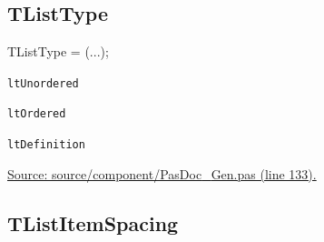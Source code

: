 \documentclass{report}
\newif\ifpdf
\begin{document}
\subsection*{TListType}
\fi
\label{PasDoc_Gen-TListType}
\begin{list}{}{
\setlength{\itemindent}{0cm}
\setlength{\listparindent}{0cm}
\setlength{\leftmargin}{\evensidemargin}
\addtolength{\leftmargin}{\tmplength}
\settowidth{\labelsep}{X}
\addtolength{\leftmargin}{\labelsep}
\setlength{\labelwidth}{\tmplength}
}
\item[\textbf{Declaration}\hfill]
\ifpdf
\begin{flushleft}
\fi
\begin{ttfamily}
TListType = (...);\end{ttfamily}

\ifpdf
\end{flushleft}
\fi

\par
\item[\textbf{Description}]
 \item[\textbf{Values}]
\begin{description}
\item[\texttt{ltUnordered}] \label{PasDoc_Gen-ltUnordered}
\index{}
 
\item[\texttt{ltOrdered}] \label{PasDoc_Gen-ltOrdered}
\index{}
 
\item[\texttt{ltDefinition}] \label{PasDoc_Gen-ltDefinition}
\index{}
 
\end{description}
\par
\href{https://github.com/pasdoc/pasdoc/blob/master/source/component/PasDoc_Gen.pas#L133}{Source: source/component/PasDoc{\_}Gen.pas (line 133).}

\end{list}
\ifpdf
\subsection*{\large{\textbf{TListItemSpacing}}\normalsize\hspace{1ex}\hrulefill}
\else
\end{document}
